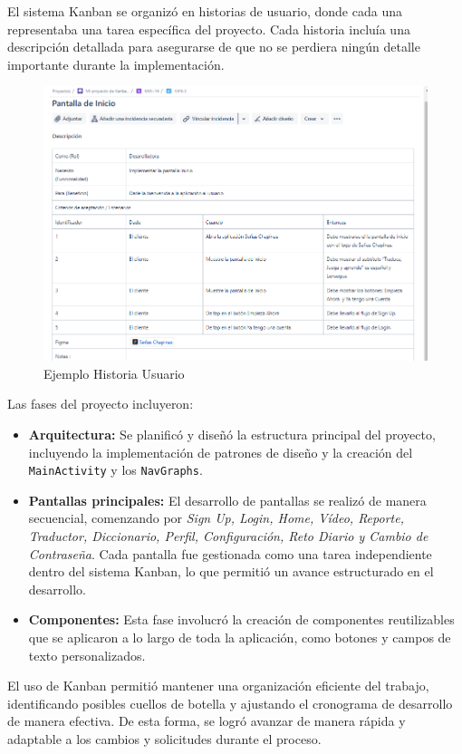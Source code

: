 El sistema Kanban se organizó en historias de usuario, donde cada una representaba una tarea específica del proyecto. Cada historia incluía una descripción detallada para asegurarse de que no se perdiera ningún detalle importante durante la implementación.

\begin{figure}  [H]
    \centering
    \includegraphics[width=0.6\linewidth]{figuras/kabana_ejemplo.png}
    \caption{Ejemplo Historia Usuario}
    \label{fig:enter-label}
\end{figure}


Las fases del proyecto incluyeron:

\begin{itemize}
    \item \textbf{Arquitectura:} Se planificó y diseñó la estructura principal del proyecto, incluyendo la implementación de patrones de diseño y la creación del \texttt{MainActivity} y los \texttt{NavGraphs}.
    \item \textbf{Pantallas principales:} El desarrollo de pantallas se realizó de manera secuencial, comenzando por\textit{ Sign Up, Login, Home, Vídeo, Reporte, Traductor, Diccionario, Perfil, Configuración, Reto Diario y Cambio de Contraseña}. Cada pantalla fue gestionada como una tarea independiente dentro del sistema Kanban, lo que permitió un avance estructurado en el desarrollo.
    \item \textbf{Componentes:} Esta fase involucró la creación de componentes reutilizables que se aplicaron a lo largo de toda la aplicación, como botones y campos de texto personalizados.
\end{itemize}

El uso de Kanban permitió mantener una organización eficiente del trabajo, identificando posibles cuellos de botella y ajustando el cronograma de desarrollo de manera efectiva. De esta forma, se logró avanzar de manera rápida y adaptable a los cambios y solicitudes durante el proceso.

